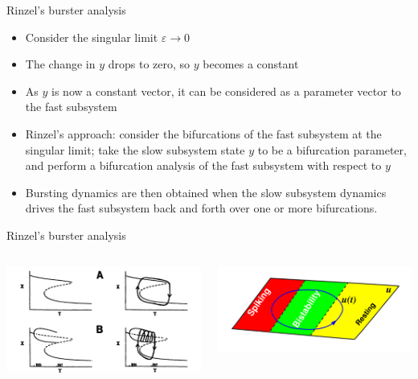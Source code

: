\documentclass{beamer}
\begin{document}
\begin{frame}[label={sec:org1b669e3}]{Rinzel's burster analysis}
\begin{itemize}[<+->]
\item Consider the singular limit \(\varepsilon \to 0\)
\item The change in \(y\) drops to zero, so \(y\) becomes a constant
\item As \(y\) is now a constant vector, it can be considered as a parameter vector to the fast subsystem
\item Rinzel's approach: consider the bifurcations of the fast subsystem at the singular limit; take the slow subsystem state \(y\) to be a bifurcation parameter, and perform a bifurcation analysis of the fast subsystem with respect to \(y\)
\item Bursting dynamics are then obtained when the slow subsystem dynamics drives the fast subsystem back and forth over one or more bifurcations.
\end{itemize}
\end{frame}

\begin{frame}[label={sec:orga777dec}]{Rinzel's burster analysis}
\begin{columns}
\begin{column}{0.5\columnwidth}
\begin{center}
\includegraphics[width=\textwidth]{rinzburst.png}
\end{center}
\end{column}

\begin{column}{0.5\columnwidth}
\begin{center}
\includegraphics[width=\textwidth]{bursterschematic.png}
\end{center}
\end{column}
\end{columns}
\end{frame}
\end{document}

